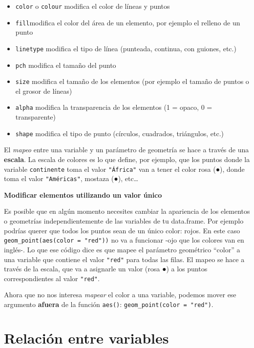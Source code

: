 \documentclass[
  openany]{book}
\providecommand{\tightlist}{%
  \setlength{\itemsep}{0pt}\setlength{\parskip}{0pt}}
\begin{document}
\begin{itemize}
\tightlist
\item
  \texttt{color} o \texttt{colour} modifica el color de líneas y puntos
\item
  \texttt{fill}modifica el color del área de un elemento, por ejemplo el relleno de un punto
\item
  \texttt{linetype} modifica el tipo de línea (punteada, continua, con guiones, etc.)
\item
  \texttt{pch} modifica el tamaño del punto
\item
  \texttt{size} modifica el tamaño de los elementos (por ejemplo el tamaño de puntos o el grosor de líneas)
\item
  \texttt{alpha} modifica la transparencia de los elementos (1 = opaco, 0 = transparente)
\item
  \texttt{shape} modifica el tipo de punto (círculos, cuadrados, triángulos, etc.)
\end{itemize}

El \emph{mapeo} entre una variable y un parámetro de geometría se hace a través de una \textbf{escala}.
La escala de colores es lo que define, por ejemplo, que los puntos donde la variable \texttt{continente} toma el valor \texttt{"África"} van a tener el color rosa ({●}), donde toma el valor \texttt{"Américas"}, mostaza ({●}), etc\ldots{}

\textbf{Modificar elementos utilizando un valor único}

Es posible que en algún momento necesites cambiar la apariencia de los elementos o geometrías independientemente de las variables de tu data.frame.
Por ejemplo podrías querer que todos los puntos sean de un único color: rojos.
En este caso \texttt{geom\_point(aes(color\ =\ "red"))} no va a funcionar -ojo que los colores van en inglés-.
Lo que ese código dice es que mapee el parámetro geométrico ``color'' a una variable que contiene el valor \texttt{"red"} para todas las filas.
El mapeo se hace a través de la escala, que va a asignarle un valor (rosa {●}) a los puntos correspondientes al valor \texttt{"red"}.

Ahora que no nos interesa \emph{mapear} el color a una variable, podemos mover ese argumento \textbf{afuera} de la función \texttt{aes()}: \texttt{geom\_point(color\ =\ "red")}.

\hypertarget{relaciuxf3n-entre-variables}{%
\section{Relación entre variables}\label{relaciuxf3n-entre-variables}}
\end{document}
